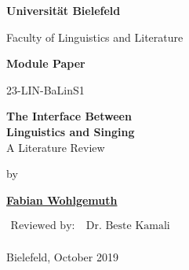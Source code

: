 \begin{center}

\Huge{\textbf{Universität Bielefeld}}

\LARGE{Faculty of Linguistics and Literature}

\vfill

\LARGE{\textbf{Module Paper}}

\Large

23-LIN-BaLinS1

\vfill


\vspace*{1cm}

\LARGE{\textbf{The Interface Between\\Linguistics and Singing}\\A Literature Review}

\Large

\vfill

by

\vspace*{1cm}

\textbf{\href{https://www.fabianwohlgemuth.de}{Fabian Wohlgemuth}}

\vfill

$\begin{aligned}
\text{Reviewed by:}&\ \text{Dr. Beste Kamali}\\
\end{aligned}$

\vfill

Bielefeld, October 2019

\end{center}
\restoregeometry